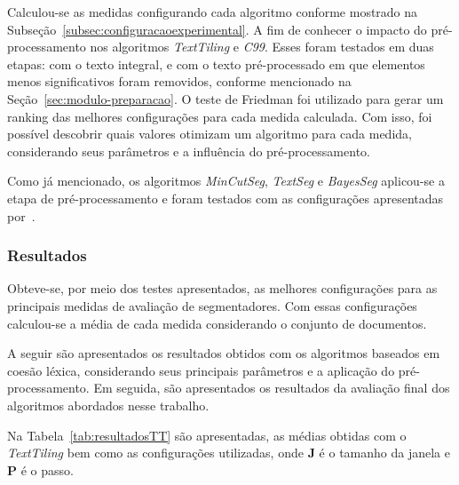Calculou-se as medidas configurando cada algoritmo conforme mostrado na Subseção~\ref{subsec:configuracaoexperimental}.  
A fim de conhecer o impacto do pré-processamento nos algoritmos \textit{TextTiling} e \textit{C99}. Esses foram testados em duas etapas: com o texto integral, e com o texto pré-processado em que elementos menos significativos foram removidos, conforme mencionado na Seção~\ref{sec:modulo-preparacao}.  
O teste de Friedman foi utilizado para gerar um ranking das melhores configurações para cada medida calculada. Com isso, foi possível descobrir quais valores otimizam um algoritmo para cada medida, considerando seus parâmetros e a influência do pré-processamento. 
 
Como já mencionado, os algoritmos \textit{MinCutSeg}, \textit{TextSeg} e \textit{BayesSeg} aplicou-se a etapa de pré-processamento e foram testados com as configurações apresentadas por~\cite{Eisenstein2008}. 










\subsubsection{Resultados}


Obteve-se, por meio dos testes apresentados, as melhores configurações para as principais medidas de avaliação de segmentadores. Com essas configurações calculou-se a média de cada medida considerando o conjunto de documentos. 


A seguir são apresentados os resultados obtidos com os algoritmos baseados em coesão léxica, considerando seus principais parâmetros e a aplicação do pré-processamento. Em seguida, são apresentados os resultados da avaliação final dos algoritmos abordados nesse trabalho.


Na Tabela~\ref{tab:resultadosTT} são apresentadas, as médias obtidas com o \textit{TextTiling} bem como as configurações utilizadas, onde \textbf{J} é o tamanho da janela e \textbf{P} é o passo.


